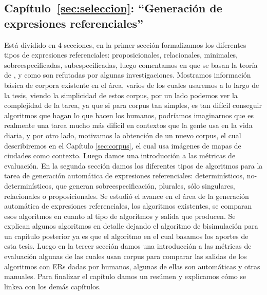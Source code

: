 \subsection{Cap\'itulo~\ref{sec:seleccion}: ``Generaci\'on de expresiones referenciales''} 
Est\'a dividido en 4 secciones, en la primer secci\'on formalizamos los diferentes tipos de expresiones referenciales: proposicionales, relacionales, minimales, sobreespecificadas, subespecificadas, luego comentamos en que se basan la teor\'ia de \cite{clark1992arenas,clark96}, \cite{Clark-Marshall81} y como son refutadas por algunas investigaciones. Mostramos informaci\'on b\'asica de corpora existente en el \'area, varios de los cuales usaremos a lo largo de la tesis, viendo la simplicidad de estos corpus, por un lado podemos ver la complejidad de la tarea, ya que si para corpus tan simples, es tan dif\'icil conseguir algoritmos que hagan lo que hacen los humanos, podr\'iamos imaginarnos que es realmente una tarea mucho m\'as dif\'icil en contextos que la gente usa en la vida diaria, y por otro lado, motivamos la obtenci\'on de un nuevo  corpus, el cual describiremos en el Cap\'itulo \ref{sec:corpus}, el cual usa im\'agenes de mapas de ciudades como contexto. Luego damos una introducci\'on a las m\'etricas de evaluaci\'on. En la segunda secci\'on damos los diferentes tipos de algoritmos para la tarea de generaci\'on autom\'atica de expresiones referenciales: determin\'isticos, no-determin\'isticos, que generan sobreespecificaci\'on, plurales, s\'olo singulares, relacionales o proposicionales. Se estudi\'o el avance en el \'area de la generaci\'on autom\'atica de expresiones referenciales, los algoritmos existentes, se comparan esos algoritmos en cuanto al tipo de algoritmos y salida que producen. Se explican algunos algoritmos en detalle dejando el algoritmo de bisimulaci\'on para un cap\'itulo posterior ya es que el algoritmo en el cual basamos los aportes de esta tesis. Luego en la tercer secci\'on damos una introducci\'on a las m\'etricas de evaluaci\'on algunas de las cuales usan corpus para comparar las salidas de los algoritmos con ERs dadas por humanos, algunas de ellas son autom\'aticas y otras manuales. Para finalizar el cap\'itulo damos un res\'umen y explicamos c\'omo se linkea con los dem\'as cap\'itulos.



